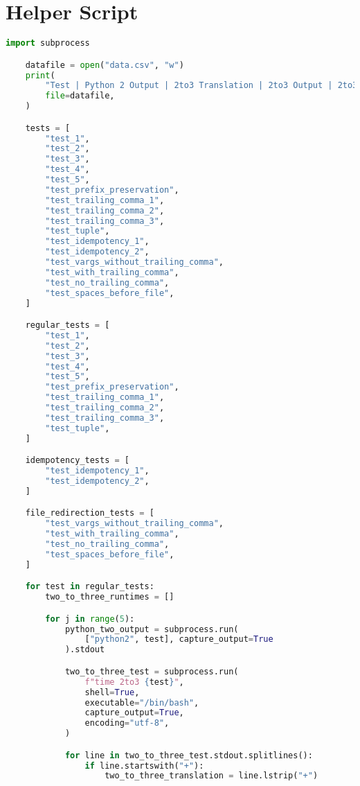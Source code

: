 \section{Helper Script}
\label{appendix:Helper-Script}
\lstset{style=pythonstyle}

\begin{lstlisting}[language=Python]
    import subprocess

    datafile = open("data.csv", "w")
    print(
        "Test | Python 2 Output | 2to3 Translation | 2to3 Output | 2to3 Output Correct | 2to3 Run Time 1 (ms) | 2to3 Run Time 2 (ms) | 2to3 Run Time 3 (ms) | 2to3 Run Time 4 (ms) | 2to3 Run Time 5 (ms) | 2to3 Average Run Time (ms)",
        file=datafile,
    )

    tests = [
        "test_1",
        "test_2",
        "test_3",
        "test_4",
        "test_5",
        "test_prefix_preservation",
        "test_trailing_comma_1",
        "test_trailing_comma_2",
        "test_trailing_comma_3",
        "test_tuple",
        "test_idempotency_1",
        "test_idempotency_2",
        "test_vargs_without_trailing_comma",
        "test_with_trailing_comma",
        "test_no_trailing_comma",
        "test_spaces_before_file",
    ]

    regular_tests = [
        "test_1",
        "test_2",
        "test_3",
        "test_4",
        "test_5",
        "test_prefix_preservation",
        "test_trailing_comma_1",
        "test_trailing_comma_2",
        "test_trailing_comma_3",
        "test_tuple",
    ]

    idempotency_tests = [
        "test_idempotency_1",
        "test_idempotency_2",
    ]

    file_redirection_tests = [
        "test_vargs_without_trailing_comma",
        "test_with_trailing_comma",
        "test_no_trailing_comma",
        "test_spaces_before_file",
    ]

    for test in regular_tests:
        two_to_three_runtimes = []

        for j in range(5):
            python_two_output = subprocess.run(
                ["python2", test], capture_output=True
            ).stdout

            two_to_three_test = subprocess.run(
                f"time 2to3 {test}",
                shell=True,
                executable="/bin/bash",
                capture_output=True,
                encoding="utf-8",
            )

            for line in two_to_three_test.stdout.splitlines():
                if line.startswith("+"):
                    two_to_three_translation = line.lstrip("+")


\end{lstlisting}
